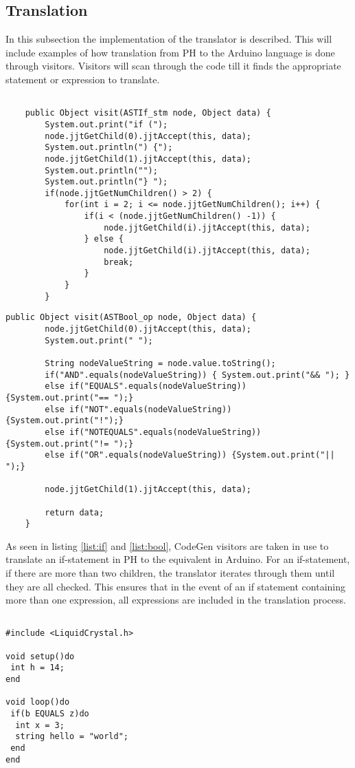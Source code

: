 \subsection{Translation}
In this subsection the implementation of the translator is described. This will include examples of how translation from PH to the Arduino language is done through visitors.
Visitors will scan through the code till it finds the appropriate statement or expression to translate.

\begin{lstlisting}[caption=Visitor for translation of an if-statement, label=list:if]

	public Object visit(ASTIf_stm node, Object data) {
		System.out.print("if (");
		node.jjtGetChild(0).jjtAccept(this, data);
		System.out.println(") {");
		node.jjtGetChild(1).jjtAccept(this, data);
		System.out.println("");
		System.out.println("} ");
		if(node.jjtGetNumChildren() > 2) {
			for(int i = 2; i <= node.jjtGetNumChildren(); i++) {
				if(i < (node.jjtGetNumChildren() -1)) {
					node.jjtGetChild(i).jjtAccept(this, data);
				} else {
					node.jjtGetChild(i).jjtAccept(this, data);
					break;
				}
			}
		}

\end{lstlisting}

\begin{lstlisting}[caption=Visitor for translation of an boolean operators, label=list:bool]
	public Object visit(ASTBool_op node, Object data) {
		node.jjtGetChild(0).jjtAccept(this, data);
		System.out.print(" ");

		String nodeValueString = node.value.toString();
		if("AND".equals(nodeValueString)) { System.out.print("&& "); }
		else if("EQUALS".equals(nodeValueString)) {System.out.print("== ");}
		else if("NOT".equals(nodeValueString)) {System.out.print("!");}
		else if("NOTEQUALS".equals(nodeValueString)) {System.out.print("!= ");}
		else if("OR".equals(nodeValueString)) {System.out.print("|| ");}

		node.jjtGetChild(1).jjtAccept(this, data);

		return data;
	}
\end{lstlisting}

As seen in listing \ref{list:if} and  \ref{list:bool}, CodeGen visitors are taken in use to translate an if-statement in PH to the equivalent in Arduino. For an if-statement, if there are more than two children, the translator iterates through them until they are all checked. This ensures that in the event of an if statement containing more than one expression, all expressions are included in the translation process.\\
\begin{lstlisting}[caption=Example of an if-statement written in PH, label=list:phstmt]

#include <LiquidCrystal.h>

void setup()do
 int h = 14;
end

void loop()do
 if(b EQUALS z)do
  int x = 3;
  string hello = "world";
 end
end
\end{lstlisting}

